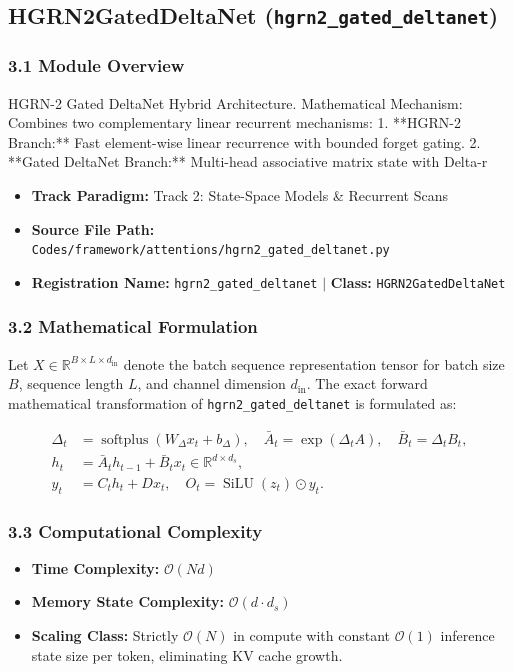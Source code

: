 \subsection{HGRN2GatedDeltaNet (\texttt{hgrn2\_gated\_deltanet})}
\label{sec:app_module_hgrn2_gated_deltanet}

\subsubsection*{3.1 Module Overview}
HGRN-2 Gated DeltaNet Hybrid Architecture.  Mathematical Mechanism:     Combines two complementary linear recurrent mechanisms:     1. **HGRN-2 Branch:** Fast element-wise linear recurrence with bounded forget gating.     2. **Gated DeltaNet Branch:** Multi-head associative matrix state with Delta-r
\begin{itemize}
    \item \textbf{Track Paradigm:} Track 2: State-Space Models & Recurrent Scans
    \item \textbf{Source File Path:} \texttt{Codes/framework/attentions/hgrn2\_gated\_deltanet.py}
    \item \textbf{Registration Name:} \texttt{hgrn2\_gated\_deltanet} $\mid$ \textbf{Class:} \texttt{HGRN2GatedDeltaNet}
\end{itemize}

\subsubsection*{3.2 Mathematical Formulation}
Let $X \in \mathbb{R}^{B \times L \times d_{\text{in}}}$ denote the batch sequence representation tensor for batch size $B$, sequence length $L$, and channel dimension $d_{\text{in}}$. The exact forward mathematical transformation of \texttt{hgrn2\_gated\_deltanet} is formulated as:

\begin{align}
\Delta_t &= \operatorname{softplus}(W_\Delta x_t + b_\Delta), \quad \bar{A}_t = \exp(\Delta_t A), \quad \bar{B}_t = \Delta_t B_t, \\
h_t &= \bar{A}_t h_{t-1} + \bar{B}_t x_t \in \mathbb{R}^{d \times d_s}, \\
y_t &= C_t h_t + D x_t, \quad O_t = \operatorname{SiLU}(z_t) \odot y_t.
\end{align}


\subsubsection*{3.3 Computational Complexity}
\begin{itemize}
    \item \textbf{Time Complexity:} $\mathcal{O}(N d)$
    \item \textbf{Memory State Complexity:} $\mathcal{O}(d \cdot d_s)$
    \item \textbf{Scaling Class:} Strictly $\mathcal{O}(N)$ in compute with constant $\mathcal{O}(1)$ inference state size per token, eliminating KV cache growth.
\end{itemize}

